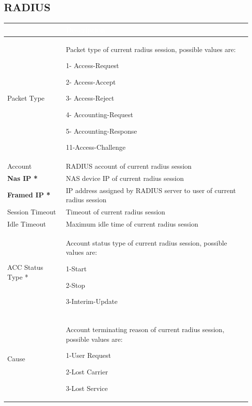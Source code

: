 \subsection*{\hypertarget{link:RADIUS}{RADIUS}}
\label{sec:appendix_c:protocol:RADIUS}

\begin{longtable}{p{}|p{}}   
    \rowcolor{black}\multicolumn{1}{l!\vlinewhite}{\textcolor{white}{Field}}  & \textcolor{white}{Description} \\\hline
    Packet Type &	Packet type of current radius session, possible values are:


                    1- Access-Request


                    2- Access-Accept


                    3- Access-Reject


                    4- Accounting-Request


                    5- Accounting-Response


                    11-Access-Challenge \\\hline
    Account &	RADIUS account of current radius session \\\hline
    \textbf{Nas IP *} &	NAS device IP of current radius session \\\hline
    \textbf{Framed IP *} &	IP address assigned by RADIUS server to user of current radius session \\\hline
    Session Timeout &	Timeout of current radius session \\\hline
    Idle Timeout &	Maximum idle time of current radius session \\\hline
    ACC Status Type * &	Account status type of current radius session, possible values are:


                        1-Start


                        2-Stop


                        3-Interim-Update \\\hline
    \tabincell{l}{Acct Terminate\\ Cause} &	Account terminating reason of current radius session, possible values are:


                                            1-User Request


                                            2-Lost Carrier


                                            3-Lost Service



\end{longtable}
